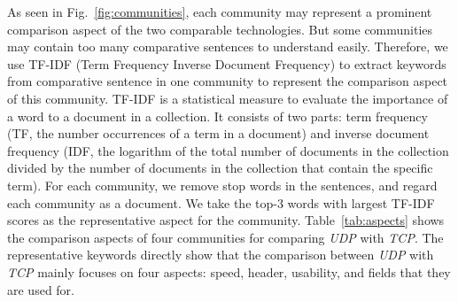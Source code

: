 As seen in Fig.~\ref{fig:communities}, each community may represent a prominent comparison aspect of the two comparable technologies.
But some communities may contain too many comparative sentences to understand easily.
Therefore, we use TF-IDF (Term Frequency Inverse Document Frequency) to extract keywords from comparative sentence in one community to represent the comparison aspect of this community.
TF-IDF is a statistical measure to evaluate the importance of a word to a document in a collection. 
It consists of two parts: term frequency (TF, the number occurrences of a term in a document) and inverse document frequency (IDF, the logarithm of the total number of documents in the collection divided by the number of documents in the collection that contain the specific term).
For each community, we remove stop words in the sentences, and regard each community as a document.
We take the top-3 words with largest TF-IDF scores as the representative aspect for the community.
Table~\ref{tab:aspects} shows the comparison aspects of four communities for comparing \textit{UDP} with \textit{TCP}.
The representative keywords directly show that the comparison between \textit{UDP} with \textit{TCP} mainly focuses on four aspects: speed, header, usability, and fields that they are used for.

